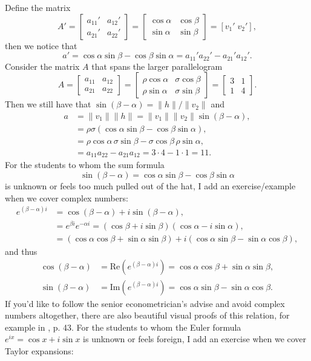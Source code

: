 \documentclass[graybox]{svmult}
\begin{document}
Define the matrix
\[
A' = \left[\begin{array}{cc}
a_{11}' & a_{12}' \\
a_{21}' & a_{22}'
\end{array}\right] =
\left[\begin{array}{cc}
\cos\alpha & \cos\beta \\
\sin\alpha & \sin\beta
\end{array}\right] = [v_1'\; v_2'],
\]
then we notice that
\[
a' = \cos\alpha \sin\beta - \cos\beta\sin\alpha = a_{11}' a_{22}' - a_{21}' a_{12}'.
\]
Consider the matrix $A$ that spans the larger parallelogram
\[
A = \left[\begin{array}{cc}
a_{11} & a_{12}\\
a_{21} & a_{22}
\end{array}\right] =
\left[\begin{array}{cc}
\rho\cos\alpha & \sigma\cos\beta \\
\rho\sin\alpha & \sigma\sin\beta
\end{array}\right] =
\left[\begin{array}{cc}
3 & 1 \\
1 & 4
\end{array}\right].
\]
Then we still have that $\sin(\beta-\alpha)= \|h\|/\|v_2\|$ and
\begin{align*}
a &= \|v_1\| \|h\| = \|v_1\| \|v_2\| \sin(\beta-\alpha),\\
 &= \rho\sigma (\cos\alpha \sin\beta - \cos\beta\sin\alpha), \\
 &= \rho\cos\alpha \,\sigma\sin\beta - \sigma\cos\beta\,\rho\sin\alpha,\\
 &= a_{11} a_{22} - a_{21} a_{12} = 3\cdot 4 - 1\cdot 1 = 11.
\end{align*}
For the students to whom the sum formula
\[
\sin(\beta-\alpha) = \cos\alpha\sin\beta-\cos\beta\sin\alpha
\]
is unknown or feels too much pulled out of the hat, I add an exercise/example when we cover complex numbers:
\begin{align*}
e^{(\beta-\alpha)i} &= \cos(\beta-\alpha) + i \sin(\beta-\alpha),\\
 &= e^{\beta i}e^{-\alpha i} = (\cos\beta + i\sin\beta)(\cos\alpha - i\sin\alpha),\\
 &= (\cos\alpha\cos\beta + \sin\alpha\sin\beta) + i(\cos\alpha\sin\beta - \sin\alpha\cos\beta),
\end{align*}
and thus
\begin{align*}
\cos(\beta-\alpha) &= \text{Re}(e^{(\beta-\alpha)i}) = \cos\alpha\cos\beta + \sin\alpha\sin\beta,\\
\sin(\beta-\alpha) &= \text{Im}(e^{(\beta-\alpha)i}) = \cos\alpha\sin\beta - \sin\alpha\cos\beta.
\end{align*}
If you'd like to follow the senior econometrician's advise and avoid complex numbers altogether, there are also beautiful visual proofs of this relation, for example in \cite{Nelsen2000}, p. 43. For the students to whom the Euler formula $e^{ix}=\cos x + i\sin x$ is unknown or feels foreign, I add an exercise when we cover Taylor expansions:
\end{document}
